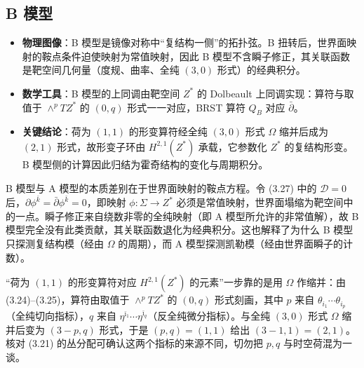 

\subsection{B 模型}
\label{sec:3.5}

\begin{keytakeaways}
  \begin{itemize}[leftmargin=1.4em,itemsep=2pt,topsep=2pt]
    \item \textbf{物理图像}：B 模型是镜像对称中“复结构一侧”的拓扑弦。B 扭转后，世界面映射的鞍点条件迫使映射为常值映射，因此 B 模型不含瞬子修正，其关联函数是靶空间几何量（度规、曲率、全纯 $(3,0)$ 形式）的经典积分。
    \item \textbf{数学工具}：B 模型的上同调由靶空间 $Z^*$ 的 Dolbeault 上同调实现：算符与取值于 $\wedge^pTZ^*$ 的 $(0,q)$ 形式一一对应，BRST 算符 $Q_B$ 对应 $\bar\partial$。
    \item \textbf{关键结论}：荷为 $(1,1)$ 的形变算符经全纯 $(3,0)$ 形式 $\Omega$ 缩并后成为 $(2,1)$ 形式，故形变子环由 $H^{2,1}(Z^*)$ 承载，它参数化 $Z^*$ 的复结构形变。B 模型侧的计算因此归结为霍奇结构的变化与周期积分。
  \end{itemize}
\end{keytakeaways}

\begin{yizhu}[物理图像]
B 模型与 A 模型的本质差别在于世界面映射的鞍点方程。令 (3.27) 中的 $\mathcal{D}=0$ 后，$\partial\phi^{\bar k}=\bar\partial\phi^{\bar k}=0$，即映射 $\phi:\Sigma\to Z^*$ 必须是常值映射，世界面塌缩为靶空间中的一点。瞬子修正来自绕数非零的全纯映射（即 A 模型所允许的非常值解），故 B 模型完全没有此类贡献，其关联函数退化为经典积分。这也解释了为什么 B 模型只探测复结构模（经由 $\Omega$ 的周期），而 A 模型探测凯勒模（经由世界面瞬子的计数）。
\end{yizhu}

\begin{yizhu}[易错点]
“荷为 $(1,1)$ 的形变算符对应 $H^{2,1}(Z^*)$ 的元素”一步靠的是用 $\Omega$ 作缩并：由 (3.24)--(3.25)，算符由取值于 $\wedge^pTZ^*$ 的 $(0,q)$ 形式刻画，其中 $p$ 来自 $\theta_{i_1}\cdots\theta_{i_p}$（全纯切向指标），$q$ 来自 $\eta^{\bar\imath_1}\cdots\eta^{\bar\imath_q}$（反全纯微分指标）。与全纯 $(3,0)$ 形式 $\Omega$ 缩并后变为 $(3-p,q)$ 形式，于是 $(p,q)=(1,1)$ 给出 $(3-1,1)=(2,1)$。核对 (3.21) 的丛分配可确认这两个指标的来源不同，切勿把 $p,q$ 与时空荷混为一谈。
\end{yizhu}

